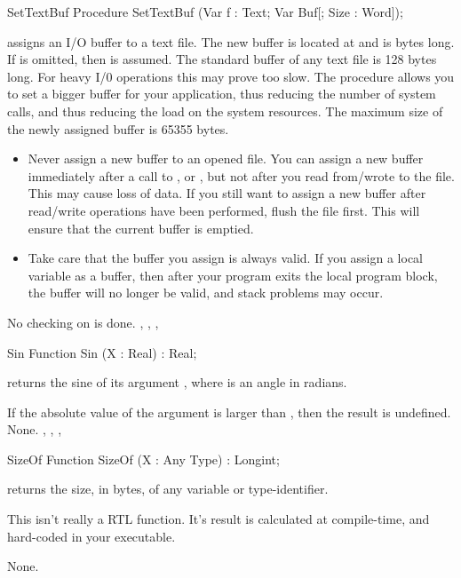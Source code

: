 \documentclass{report}
\begin{document}
\begin{procedure}{SetTextBuf}
\Declaration
Procedure SetTextBuf (Var f : Text; Var Buf[; Size : Word]);

\Description
{} assigns an I/O buffer to a text file. The new buffer is
located at  and is  bytes long. If  is omitted,
then  is assumed.
The standard buffer of any text file is 128 bytes long. For heavy I/0
operations this may prove too slow. The  procedure allows
you to set a bigger buffer for your application, thus reducing the number of
system calls, and thus reducing the load on the system resources.
The maximum size of the newly assigned buffer is 65355 bytes.
\begin{remark}
\begin{itemize}
\item Never assign a new buffer to an opened file. You can assign a
new buffer immediately after a call to ,  or
, but not after you read from/wrote to the file. This may cause
loss of data. If you still want to assign a new buffer after read/write
operations have been performed, flush the file first. This will ensure that
the current buffer is emptied.
\item Take care that the buffer you assign is always valid. If you
assign a local variable as a buffer, then after your program exits the local
program block, the buffer will no longer be valid, and stack problems may
occur.
\end{itemize}
\end{remark}
\Errors
No checking on  is done.
\SeeAlso
{}, , , 
\end{procedure}


\begin{function}{Sin}
\Declaration
Function Sin (X : Real) : Real;

\Description
{} returns the sine of its argument , where  is an
angle in radians. 

If the absolute value of the argument is larger than , then the
result is undefined.
\Errors
None.
\SeeAlso
{}, , , 
\end{function}


\begin{function}{SizeOf}
\Declaration
Function SizeOf (X : Any Type) : Longint;

\Description
{} returns the size, in bytes, of any variable or type-identifier.
\begin{remark} 
This isn't really a RTL function. It's result is calculated at
compile-time, and hard-coded in your executable.
\end{remark}
\Errors
None.
\SeeAlso
{}
\end{function}
\end{document}
